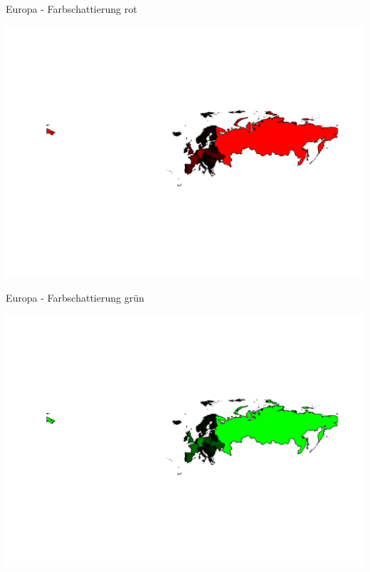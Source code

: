 \documentclass[ignorenonframetext,]{beamer}
\begin{document}
\begin{frame}{Europa - Farbschattierung rot}

\includegraphics{Geomedizin_files/figure-beamer/unnamed-chunk-101-1.pdf}

\end{frame}

\begin{frame}{Europa - Farbschattierung grün}

\includegraphics{Geomedizin_files/figure-beamer/unnamed-chunk-102-1.pdf}

\end{frame}
\end{document}
